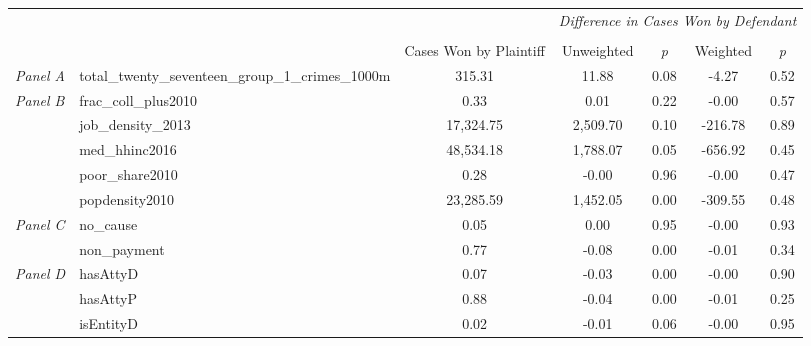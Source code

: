 \begin{tabular}{llccccc}
\toprule
 &  & \textit{} & \multicolumn{4}{c}{\textit{Difference in Cases Won by Defendant}} \\
\cline{4-7}
\\
 &  & Cases Won by Plaintiff & Unweighted & \emph{p} & Weighted & \emph{p} \\
\midrule
\textit{Panel A} & total_twenty_seventeen_group_1_crimes_1000m & 315.31 & 11.88 & 0.08 & -4.27 & 0.52 \\
\cline{1-7}
\multirow[c]{5}{3cm}{\textit{Panel B}} & frac_coll_plus2010 & 0.33 & 0.01 & 0.22 & -0.00 & 0.57 \\
 & job_density_2013 & 17,324.75 & 2,509.70 & 0.10 & -216.78 & 0.89 \\
 & med_hhinc2016 & 48,534.18 & 1,788.07 & 0.05 & -656.92 & 0.45 \\
 & poor_share2010 & 0.28 & -0.00 & 0.96 & -0.00 & 0.47 \\
 & popdensity2010 & 23,285.59 & 1,452.05 & 0.00 & -309.55 & 0.48 \\
\cline{1-7}
\multirow[c]{2}{3cm}{\textit{Panel C}} & no_cause & 0.05 & 0.00 & 0.95 & -0.00 & 0.93 \\
 & non_payment & 0.77 & -0.08 & 0.00 & -0.01 & 0.34 \\
\cline{1-7}
\multirow[c]{3}{3cm}{\textit{Panel D}} & hasAttyD & 0.07 & -0.03 & 0.00 & -0.00 & 0.90 \\
 & hasAttyP & 0.88 & -0.04 & 0.00 & -0.01 & 0.25 \\
 & isEntityD & 0.02 & -0.01 & 0.06 & -0.00 & 0.95 \\
\cline{1-7}
\bottomrule
\end{tabular}
